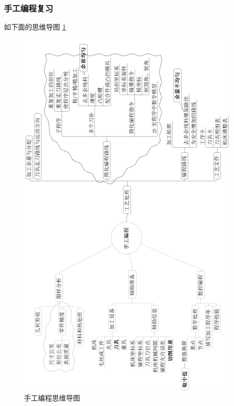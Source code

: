 \subsubsection{手工编程复习} 
如下面的思维导图 \ref{手工编程思维导图}
\begin{figure}	
	\includegraphics{images/tu1} 
	\caption{手工编程思维导图}\label{手工编程思维导图}
\end{figure}

